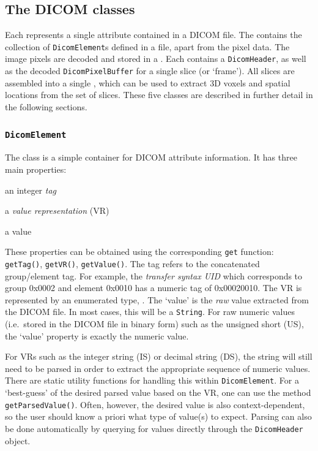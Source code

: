 \subsection{The DICOM classes}

Each  represents a single attribute contained in a DICOM file.
The  contains the collection of \lstinline{DicomElement}s defined in a file, 
apart from the pixel data.  The image pixels are decoded and stored in a .  
Each  contains a \lstinline{DicomHeader}, as well as
the decoded \lstinline{DicomPixelBuffer} for a single slice (or `frame').  All slices are assembled into a single 
, which can be used to extract 3D voxels and spatial locations from the set of slices.  
These five classes are described in further detail in the following sections.

\subsubsection{\texttt{DicomElement}}

The  class is a simple container for DICOM attribute information.  It has
three main properties:
\begin{tightemize}
\item an integer \emph{tag}
\item a \emph{value representation} (VR)
\item a value
\end{tightemize}
These properties can be obtained using the corresponding \lstinline{get} function: \lstinline{getTag()}, \lstinline{getVR()}, \lstinline{getValue()}.  The tag refers to the concatenated group/element tag. For example, the \emph{transfer syntax UID} which corresponds to group 0x0002 and element 0x0010 has a numeric tag of 0x00020010. The VR is represented by an enumerated type, .  The `value' is the \emph{raw} value extracted from the DICOM file.  In most cases, this will be a \lstinline{String}.  For raw numeric values (i.e.~stored in the DICOM file in binary form) such as the unsigned short (US), the `value' property is exactly the numeric value.

For VRs such as the integer string (IS) or decimal string (DS), the string will still need to be parsed in order to extract the appropriate sequence of numeric values.  There are static utility functions for handling this within \lstinline{DicomElement}.  For a `best-guess' of the desired parsed value based on the VR, one can use the method \lstinline{getParsedValue()}.  Often, however, the desired value is also context-dependent, so the user should know a priori what type of value(s) to expect.  Parsing can also be done automatically by querying for values directly through the \lstinline{DicomHeader} object.  

